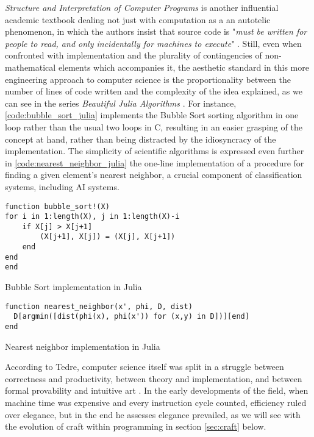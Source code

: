 \emph{Structure and Interpretation of Computer Programs} is another influential academic textbook dealing not just with computation as a an autotelic phenomenon, in which the authors insist that source code is "\emph{must be written for people to read, and only incidentally for machines to execute}" \citep{abelson_structure_1979}. Still, even when confronted with implementation and the plurality of contingencies of non-mathematical elements which accompanies it, the aesthetic standard in this more engineering approach to computer science is the proportionality between the number of lines of code written and the complexity of the idea explained, as we can see in the series \emph{Beautiful Julia Algorithms} \citep{moss_beautifulalgorithms_2022}. For instance, \ref{code:bubble_sort_julia} implements the Bubble Sort sorting algorithm in one loop rather than the usual two loops in C, resulting in an easier grasping of the concept at hand, rather than being distracted by the idiosyncracy of the implementation. The simplicity of scientific algorithms is expressed even further in \ref{code:nearest_neighbor_julia} the one-line implementation of a procedure for finding a given element's nearest neighbor, a crucial component of classification systems, including AI systems.

\begin{listing}
  \begin{verbatim}
function bubble_sort!(X)
for i in 1:length(X), j in 1:length(X)-i
    if X[j] > X[j+1]
        (X[j+1], X[j]) = (X[j], X[j+1])
    end
end
end
\end{verbatim}
  \caption{Bubble Sort implementation in Julia}
  \label{code:bubble_sort_julia}
\end{listing}

\begin{listing}
  \begin{verbatim}
function nearest_neighbor(x', phi, D, dist)
  D[argmin([dist(phi(x), phi(x')) for (x,y) in D])][end]
end
\end{verbatim}
  \caption{Nearest neighbor implementation in Julia}
  \label{code:nearest_neighbor_julia}
\end{listing}

According to Tedre, computer science itself was split in a struggle between correctness and productivity, between theory and implementation, and between formal provability and intuitive art \citep{tedre_science_2014}. In the early developments of the field, when machine time was expensive and every instruction cycle counted, efficiency ruled over elegance, but in the end he assesses elegance prevailed, as we will see with the evolution of craft within programming in section \ref{sec:craft} below.

